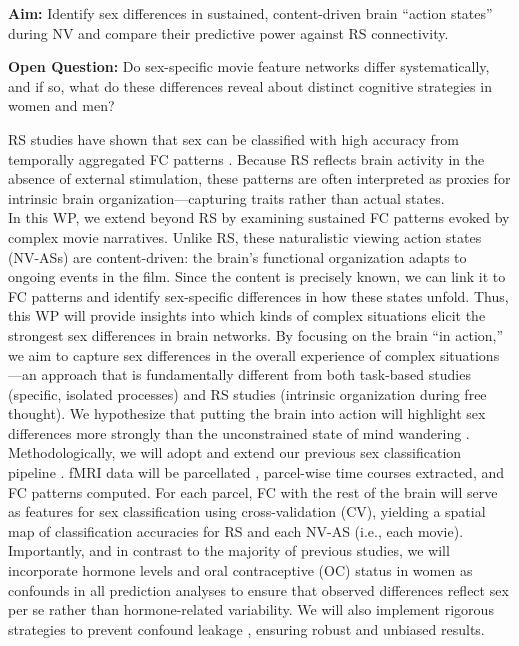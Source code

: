 \documentclass[11pt,a4paper]{article}
\begin{document}
\textbf{Aim:} Identify sex differences in sustained, content-driven brain “action states” during NV 
and compare their predictive power against RS connectivity.

\textbf{Open Question:} Do sex-specific movie feature networks differ systematically, and if so, 
what do these differences reveal about distinct cognitive strategies in women and men?  

RS studies have shown that sex can be classified with high accuracy from temporally aggregated FC 
patterns \parencite{casanovaCombiningGraphMachine2012a,ritchieSexDifferencesAdult2018,weisSexClassificationResting2020a,wierschAccurateSexPrediction2023a,wierschSexDifferencesBrain2021a}. 
Because RS reflects brain activity in the absence of external stimulation, these patterns are often 
interpreted as proxies for intrinsic brain organization—capturing traits rather than actual states.\\ 
In this WP, we extend beyond RS by examining sustained FC patterns evoked by complex movie narratives. 
Unlike RS, these naturalistic viewing action states (NV-ASs) are content-driven: the brain's functional organization 
adapts to ongoing events in the film. Since the content is precisely known, we can link it to FC patterns and 
identify sex-specific differences in how these states unfold. 
Thus, this WP will provide insights into which kinds of complex situations elicit the strongest sex differences in 
brain networks. 
By focusing on the brain “in action,” we aim to capture sex differences in the overall experience of 
complex situations—an approach that is fundamentally different from both task-based studies 
(specific, isolated processes) and RS studies (intrinsic organization during free thought). 
We hypothesize that putting the brain into action will highlight sex differences more strongly than the 
unconstrained state of mind wandering \parencite{vanderwalIndividualDifferencesFunctional2017}.\\
Methodologically, we will adopt and extend our previous sex classification pipeline \parencite{weisSexClassificationResting2020a}. 
fMRI data will be parcellated \parencite{schaeferLocalGlobalParcellationHuman2018}, parcel-wise time courses extracted, 
and FC patterns computed. For each parcel, FC with the rest of the brain will serve as features for 
sex classification using cross-validation (CV), yielding a spatial map of classification accuracies for RS and 
each NV-AS (i.e., each movie).
Importantly, and in contrast to the majority of previous studies, we will incorporate hormone levels and oral contraceptive (OC) status in women as confounds in all 
prediction analyses to ensure that observed differences reflect sex per se rather than hormone-related variability. 
We will also implement rigorous strategies to prevent confound leakage \parencite{hamdanConfoundleakageConfoundRemoval2022a}, 
ensuring robust and unbiased results.
\end{document}
